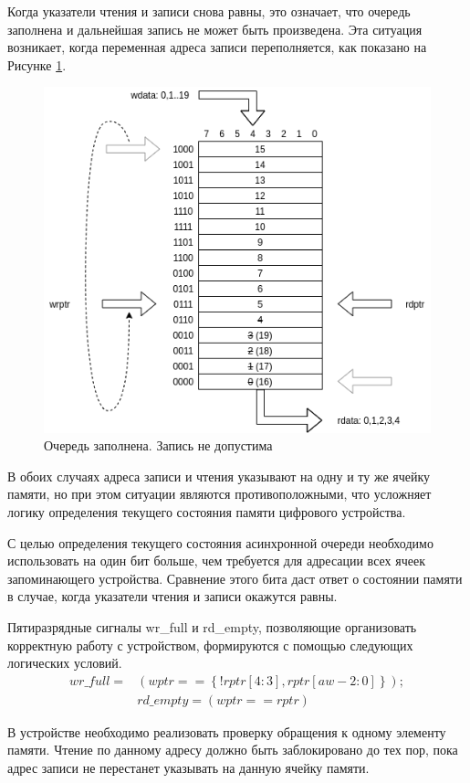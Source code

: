 Когда указатели чтения и записи снова равны, это означает, что очередь заполнена и дальнейшая запись не может быть произведена. Эта ситуация возникает, когда переменная адреса записи переполняется, как показано на Рисунке \ref{fig:full-fifo}.

\begin{figure}[h!]
	\centering
	\includegraphics[width=0.7\linewidth]{course-scheme/images/full-fifo}
	\caption{Очередь заполнена. Запись не допустима}
	\label{fig:full-fifo}
\end{figure}

В обоих случаях адреса записи и чтения указывают на одну и ту же ячейку памяти, но при этом ситуации являются противоположными, что усложняет логику определения текущего состояния памяти цифрового устройства.

С целью определения текущего состояния асинхронной очереди необходимо использовать на один бит больше, чем требуется для адресации всех ячеек запоминающего устройства. Сравнение этого бита даст ответ о состоянии памяти в случае, когда указатели чтения и записи окажутся равны.

Пятиразрядные сигналы wr\_full и rd\_empty, позволяющие организовать корректную работу с устройством, формируются с помощью следующих логических условий.
\begin{align}
	 wr\_full = &\left(wptr  == \left\{!rptr[4:3],rptr[aw-2:0]\right\}\right);\\
	 &rd\_empty = \left(wptr  == rptr\right)
\end{align}

В устройстве необходимо реализовать проверку обращения к одному элементу памяти. Чтение по данному адресу должно быть заблокировано до тех пор, пока адрес записи не перестанет указывать на данную ячейку памяти.

